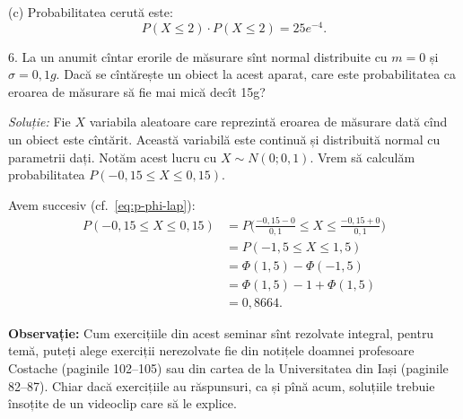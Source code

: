 (c) Probabilitatea cerută este:
\[
  P(X \leq 2) \cdot P(X \leq 2) = 25e^{-4}.
\]

6. La un anumit cîntar erorile de măsurare sînt normal distribuite cu $ m = 0 $ și
$ \sigma = 0,1 g $. Dacă se cîntărește un obiect la acest aparat, care este
probabilitatea ca eroarea de măsurare să fie mai mică decît 15g?

\emph{Soluție:} Fie $ X $ variabila aleatoare care reprezintă eroarea de măsurare
dată cînd un obiect este cîntărit. Această variabilă este continuă și distribuită
normal cu parametrii dați. Notăm acest lucru cu $ X \sim N(0; 0,1) $.
Vrem să calculăm probabilitatea $ P(-0,15 \leq X \leq 0,15) $.

Avem succesiv (cf.~\eqref{eq:p-phi-lap}):
\begin{align*}
  P(-0,15 \leq X \leq 0,15) &= P\Big( \frac{-0,15 - 0}{0,1} \leq X \leq \frac{-0,15 + 0}{0,1} \Big) \\
                            &= P(-1,5 \leq X \leq 1,5) \\
                            &= \Phi(1,5) - \Phi(-1,5) \\
                            &= \Phi(1,5) - 1 + \Phi(1,5) \\
                            &= 0,8664.
\end{align*}

\textbf{Observație:} Cum exercițiile din acest seminar sînt rezolvate integral,
pentru temă, puteți alege exerciții nerezolvate fie din notițele doamnei profesoare
Costache (paginile 102--105) sau din cartea de la Universitatea din Iași (paginile 82--87).
Chiar dacă exercițiile au răspunsuri, ca și pînă acum, soluțiile trebuie însoțite
de un videoclip care să le explice.


